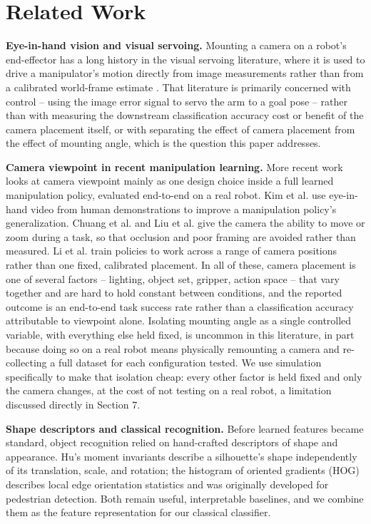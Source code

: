\documentclass[conference]{IEEEtran}
\begin{document}
\section{Related Work}

\textbf{Eye-in-hand vision and visual servoing.} Mounting a camera on a robot's end-effector has a long history in the visual servoing literature, where it is used to drive a manipulator's motion directly from image measurements rather than from a calibrated world-frame estimate \cite{hutchinson1996tutorial}. That literature is primarily concerned with control -- using the image error signal to servo the arm to a goal pose -- rather than with measuring the downstream classification accuracy cost or benefit of the camera placement itself, or with separating the effect of camera placement from the effect of mounting angle, which is the question this paper addresses.



\textbf{Camera viewpoint in recent manipulation learning.} More recent work looks at camera viewpoint mainly as one design choice inside a full learned manipulation policy, evaluated end-to-end on a real robot. Kim et al. \cite{kim2023givingrobots} use eye-in-hand video from human demonstrations to improve a manipulation policy's generalization. Chuang et al. \cite{chuang2024activevision} and Liu et al. \cite{liu2025avr} give the camera the ability to move or zoom during a task, so that occlusion and poor framing are avoided rather than measured. Li et al. \cite{li2026fromfixed} train policies to work across a range of camera positions rather than one fixed, calibrated placement. In all of these, camera placement is one of several factors -- lighting, object set, gripper, action space -- that vary together and are hard to hold constant between conditions, and the reported outcome is an end-to-end task success rate rather than a classification accuracy attributable to viewpoint alone. Isolating mounting angle as a single controlled variable, with everything else held fixed, is uncommon in this literature, in part because doing so on a real robot means physically remounting a camera and re-collecting a full dataset for each configuration tested. We use simulation specifically to make that isolation cheap: every other factor is held fixed and only the camera changes, at the cost of not testing on a real robot, a limitation discussed directly in Section 7.



\textbf{Shape descriptors and classical recognition.} Before learned features became standard, object recognition relied on hand-crafted descriptors of shape and appearance. Hu's moment invariants \cite{hu1962moments} describe a silhouette's shape independently of its translation, scale, and rotation; the histogram of oriented gradients (HOG) \cite{dalal2005hog} describes local edge orientation statistics and was originally developed for pedestrian detection. Both remain useful, interpretable baselines, and we combine them as the feature representation for our classical classifier.
\end{document}
